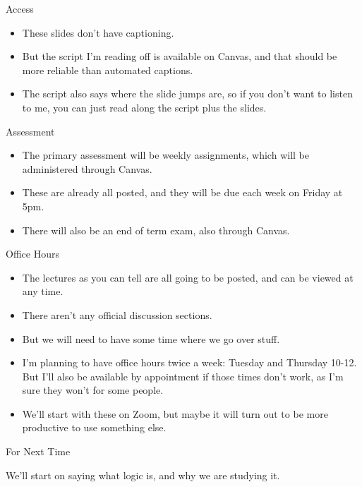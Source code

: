 \documentclass[
  ignorenonframetext,
]{beamer}
\providecommand{\tightlist}{%
  \setlength{\itemsep}{0pt}\setlength{\parskip}{0pt}}
\renewcommand{\,}{\text{, }}
\begin{document}
\begin{frame}{Access}
\protect\hypertarget{access}{}

\begin{itemize}
\tightlist
\item
  These slides don't have captioning.
\item
  But the script I'm reading off is available on Canvas, and that should
  be more reliable than automated captions.
\item
  The script also says where the slide jumps are, so if you don't want
  to listen to me, you can just read along the script plus the slides.
\end{itemize}

\end{frame}

\begin{frame}{Assessment}
\protect\hypertarget{assessment}{}

\begin{itemize}
\tightlist
\item
  The primary assessment will be weekly assignments, which will be
  administered through Canvas.
\item
  These are already all posted, and they will be due each week on Friday
  at 5pm.
\item
  There will also be an end of term exam, also through Canvas.
\end{itemize}

\end{frame}

\begin{frame}{Office Hours}
\protect\hypertarget{office-hours}{}

\begin{itemize}
\tightlist
\item
  The lectures as you can tell are all going to be posted, and can be
  viewed at any time.
\item
  There aren't any official discussion sections.
\item
  But we will need to have some time where we go over stuff.
\item
  I'm planning to have office hours twice a week: Tuesday and Thursday
  10-12. But I'll also be available by appointment if those times don't
  work, as I'm sure they won't for some people.
\item
  We'll start with these on Zoom, but maybe it will turn out to be more
  productive to use something else.
\end{itemize}

\end{frame}

\begin{frame}{For Next Time}
\protect\hypertarget{for-next-time}{}

We'll start on saying what logic is, and why we are studying it.

\end{frame}
\end{document}
